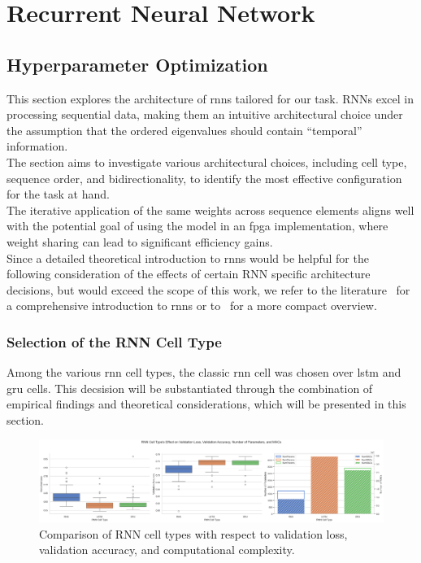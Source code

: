 \section{Recurrent Neural Network}

\subsection{Hyperparameter Optimization}

This section explores the architecture of \glspl{rnn} tailored for our task. RNNs excel in processing sequential data,
making them an intuitive architectural choice under the assumption that the ordered eigenvalues should contain ``temporal'' information.\\
The section aims to investigate various architectural choices, including cell type, sequence order, and bidirectionality, to identify the
most effective configuration for the task at hand. \\
The iterative application of the same weights across sequence elements aligns well with the potential goal of using the
model in an \gls{fpga} implementation, where weight sharing can lead to significant efficiency gains.\\

Since a detailed theoretical introduction to \glspl{rnn} would be helpful for the following consideration of the effects of
certain RNN specific architecture decisions, but would
exceed the scope of this work, we refer to the literature~\cite[Chapter 10.2 ff.]{dlbook} for a comprehensive introduction to
\glspl{rnn} or to~\cite{dlcheatsheet} for a more compact overview.\\

\subsubsection{Selection of the RNN Cell Type}

Among the various \gls{rnn} cell types, the classic \gls{rnn} cell was chosen over \gls{lstm} and \gls{gru} cells. This
decsision will be substantiated through the combination of empirical findings and theoretical considerations, which will
be presented in this section.\\

\begin{figure}[H]
    \centering
    \includegraphics[width=1\textwidth]{figures/06_ModelExploration/RNN/rnn_cell_types.png}
    \caption{Comparison of RNN cell types with respect to validation loss, validation accuracy, and computational complexity.}
    \label{fig:rnn_cell_types}
\end{figure}

